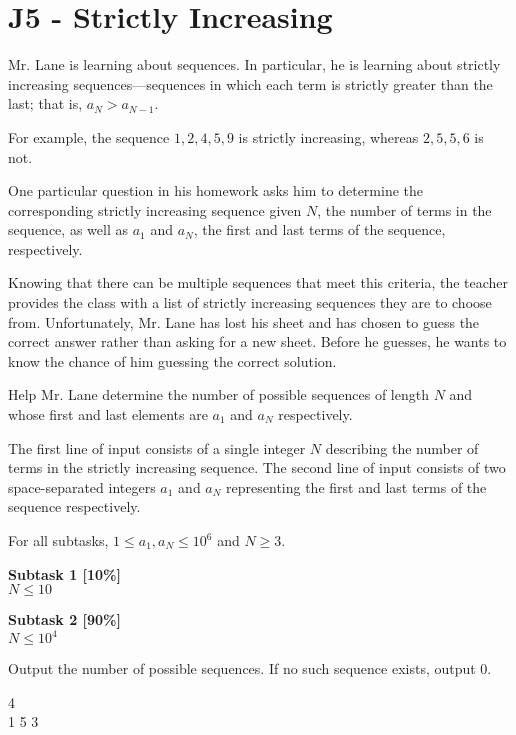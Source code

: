 \section*{J5 - Strictly Increasing}
Mr. Lane is learning about sequences. In particular, he is learning about strictly increasing sequences—sequences in which each term is strictly greater than the last; that is, $a_N>a_{N−1}$.

For example, the sequence $1,2,4,5,9$ is strictly increasing, whereas $2,5,5,6$ is not.

One particular question in his homework asks him to determine the corresponding strictly increasing sequence given $N$, the number of terms in the sequence, as well as $a_1$ and $a_N$, the first and last terms of the sequence, respectively.

Knowing that there can be multiple sequences that meet this criteria, the teacher provides the class with a list of strictly increasing sequences they are to choose from. Unfortunately, Mr. Lane has lost his sheet and has chosen to guess the correct answer rather than asking for a new sheet. Before he guesses, he wants to know the chance of him guessing the correct solution.

Help Mr. Lane determine the number of possible sequences of length $N$ and whose first and last elements are $a_1$ and $a_N$ respectively.

The first line of input consists of a single integer $N$ describing the number of terms in the strictly increasing sequence. The second line of input consists of two space-separated integers $a_1$ and $a_N$ representing the first and last terms of the sequence respectively.

\constraints
For all subtasks, $1 \leq a_1, a_N \leq 10^6$ and $N \geq 3$.

\textbf{Subtask 1 [10\%]} \\
$N \leq 10$ 

\textbf{Subtask 2 [90\%]} \\
$N \leq 10^4$

\outputformat
Output the number of possible sequences. If no such sequence exists, output $0$.

\addsample
{
    4 \\
    1 5
}
{
    3
}